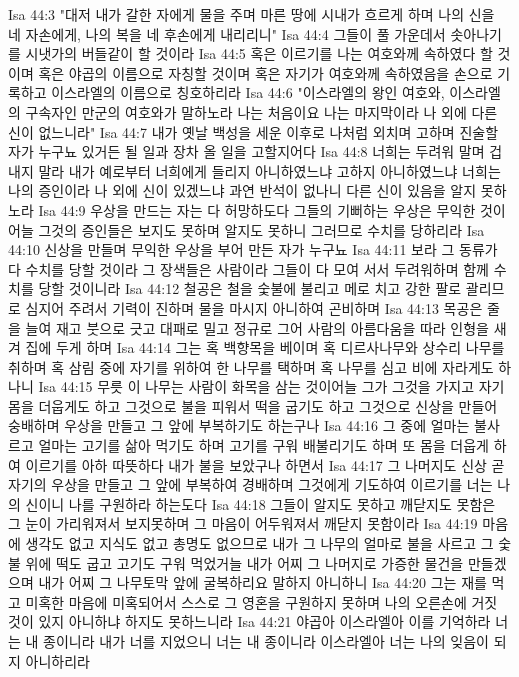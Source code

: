 Isa 44:3  "대저 내가 갈한 자에게 물을 주며 마른 땅에 시내가 흐르게 하며 나의 신을 네 자손에게, 나의 복을 네 후손에게 내리리니"
Isa 44:4  그들이 풀 가운데서 솟아나기를 시냇가의 버들같이 할 것이라
Isa 44:5  혹은 이르기를 나는 여호와께 속하였다 할 것이며 혹은 야곱의 이름으로 자칭할 것이며 혹은 자기가 여호와께 속하였음을 손으로 기록하고 이스라엘의 이름으로 칭호하리라
Isa 44:6  "이스라엘의 왕인 여호와, 이스라엘의 구속자인 만군의 여호와가 말하노라 나는 처음이요 나는 마지막이라 나 외에 다른 신이 없느니라"
Isa 44:7  내가 옛날 백성을 세운 이후로 나처럼 외치며 고하며 진술할 자가 누구뇨 있거든 될 일과 장차 올 일을 고할지어다
Isa 44:8  너희는 두려워 말며 겁내지 말라 내가 예로부터 너희에게 들리지 아니하였느냐 고하지 아니하였느냐 너희는 나의 증인이라 나 외에 신이 있겠느냐 과연 반석이 없나니 다른 신이 있음을 알지 못하노라
Isa 44:9  우상을 만드는 자는 다 허망하도다 그들의 기뻐하는 우상은 무익한 것이어늘 그것의 증인들은 보지도 못하며 알지도 못하니 그러므로 수치를 당하리라
Isa 44:10  신상을 만들며 무익한 우상을 부어 만든 자가 누구뇨
Isa 44:11  보라 그 동류가 다 수치를 당할 것이라 그 장색들은 사람이라 그들이 다 모여 서서 두려워하며 함께 수치를 당할 것이니라
Isa 44:12  철공은 철을 숯불에 불리고 메로 치고 강한 팔로 괄리므로 심지어 주려서 기력이 진하며 물을 마시지 아니하여 곤비하며
Isa 44:13  목공은 줄을 늘여 재고 붓으로 긋고 대패로 밀고 정규로 그어 사람의 아름다움을 따라 인형을 새겨 집에 두게 하며
Isa 44:14  그는 혹 백향목을 베이며 혹 디르사나무와 상수리 나무를 취하며 혹 삼림 중에 자기를 위하여 한 나무를 택하며 혹 나무를 심고 비에 자라게도 하나니
Isa 44:15  무릇 이 나무는 사람이 화목을 삼는 것이어늘 그가 그것을 가지고 자기 몸을 더웁게도 하고 그것으로 불을 피워서 떡을 굽기도 하고 그것으로 신상을 만들어 숭배하며 우상을 만들고 그 앞에 부복하기도 하는구나
Isa 44:16  그 중에 얼마는 불사르고 얼마는 고기를 삶아 먹기도 하며 고기를 구워 배불리기도 하며 또 몸을 더웁게 하여 이르기를 아하 따뜻하다 내가 불을 보았구나 하면서
Isa 44:17  그 나머지도 신상 곧 자기의 우상을 만들고 그 앞에 부복하여 경배하며 그것에게 기도하여 이르기를 너는 나의 신이니 나를 구원하라 하는도다
Isa 44:18  그들이 알지도 못하고 깨닫지도 못함은 그 눈이 가리워져서 보지못하며 그 마음이 어두워져서 깨닫지 못함이라
Isa 44:19  마음에 생각도 없고 지식도 없고 총명도 없으므로 내가 그 나무의 얼마로 불을 사르고 그 숯불 위에 떡도 굽고 고기도 구워 먹었거늘 내가 어찌 그 나머지로 가증한 물건을 만들겠으며 내가 어찌 그 나무토막 앞에 굴복하리요 말하지 아니하니
Isa 44:20  그는 재를 먹고 미혹한 마음에 미혹되어서 스스로 그 영혼을 구원하지 못하며 나의 오른손에 거짓 것이 있지 아니하냐 하지도 못하느니라
Isa 44:21  야곱아 이스라엘아 이를 기억하라 너는 내 종이니라 내가 너를 지었으니 너는 내 종이니라 이스라엘아 너는 나의 잊음이 되지 아니하리라
